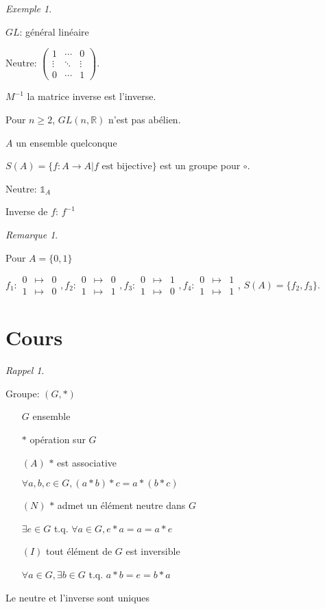 \documentclass{report}
\newcounter{cours}
\newcommand*{\cours}{\section*{Cours \thecours}\stepcounter{cours}}
\newcommand*{\gte}{\geqslant}
\newcommand*{\reels}{\mathbb{R}}
\newcommand*{\identite}{\mathds{1}}
\theoremstyle{definition}
\theoremstyle{remark}
\newtheorem*{exem}{Exemple}
\newtheorem*{rema}{Remarque}
\newtheorem*{rappel}{Rappel}
\begin{document}
\begin{exem}
\begin{nlist}[resume]
			$GL$: g\'en\'eral lin\'eaire

			Neutre: $\left( \begin{array}{ccc}
				1&\dotsb&0\\
				\vdots&\ddots&\vdots\\
				0&\dotsb&1
			\end{array} \right)$.

			$M^{-1}$ la matrice inverse est l'inverse.

			Pour $n \gte 2$, $GL(n,\reels)$  n'est pas ab\'elien.
			\item $A$ un ensemble quelconque

			$S(A)=\{f:A \to A|f \text{ est bijective}\}$ est un groupe pour $\circ$.

			Neutre: $\identite_A$

			Inverse de $f$: $f^{-1}$
		\end{nlist}
	\end{exem}
	\begin{rema}
		~

		Pour $A=\{0,1\}$

		$f_1:\begin{array}{rcl}
			0&\mapsto&0\\
			1&\mapsto&0
		\end{array},f_2:\begin{array}{rcl}
			0&\mapsto&0\\
			1&\mapsto&1
		\end{array},f_3:\begin{array}{rcl}
			0&\mapsto&1\\
			1&\mapsto&0
		\end{array},f_4:\begin{array}{rcl}
			0&\mapsto&1\\
			1&\mapsto&1
		\end{array}$, $S(A)=\{f_2,f_3\}$.
	\end{rema}

	\cours
	\begin{rappel}
		~

		\begin{ulist}[noitemsep]
			\item Groupe: $(G,*)$
			\begin{itemize}
				\item[$G$] ensemble
				\item[$*$] op\'eration sur $G$
				\item[$(A)$] $*$ est associative

				$\forall a,b,c \in G, (a*b)*c=a*(b*c)$
				\item[$(N)$] $*$ admet un \'el\'ement neutre dans $G$

				$\exists e \in G$ t.q. $\forall a \in G, e*a=a=a*e$
				\item[$(I)$] tout \'el\'ement de $G$ est inversible

				$\forall a \in G, \exists b \in G$ t.q. $a*b=e=b*a$
			\end{itemize}
			\item Le neutre et l'inverse sont uniques
		\end{ulist}
	\end{rappel}
\end{document}
